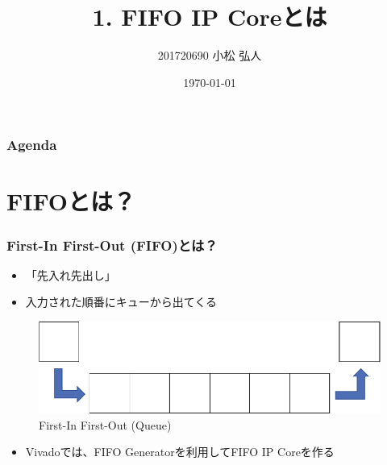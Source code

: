 ﻿\documentclass[dvipdfmx]{beamer}
\title{1. FIFO IP Coreとは}
\author{201720690 小松 弘人}
\date{\today}
\begin{document}
\maketitle

\begin{frame}
	\frametitle{Agenda}
	\tableofcontents
\end{frame}

\section{FIFOとは？}
\begin{frame}
	\frametitle{First-In First-Out (FIFO)とは？}
	\begin{itemize}
		\item
			「先入れ先出し」
			\vfill
		\item
			入力された順番にキューから出てくる
	\end{itemize}
	\vfill
	\begin{figure}[ht]
		\centering
		\includegraphics[width=0.6\linewidth]{../img/queue.pdf}
		\caption{First-In First-Out (Queue)}
		\label{img:queue}
	\end{figure}
	\begin{itemize}
		\item
			Vivadoでは、FIFO Generatorを利用してFIFO IP Coreを作る
	\end{itemize}
\end{frame}
\end{document}
